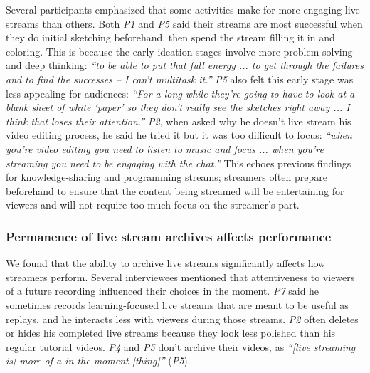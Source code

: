 Several participants emphasized that some activities make for more engaging live streams than others. Both \textit{P1} and \textit{P5} said their streams are most successful when they do initial sketching beforehand, then spend the stream filling it in and coloring. This is because the early ideation stages involve more problem-solving and deep thinking: \textit{``to be able to put that full energy ... to get through the failures and to find the successes -- I can't multitask it.''} \textit{P5} also felt this early stage was less appealing for audiences: \textit{``For a long while they're going to have to look at a blank sheet of white `paper' so they don't really see the sketches right away ... I think that loses their attention.''} \textit{P2}, when asked why he doesn't live stream his video editing process, he said he tried it but it was too difficult to focus: \textit{``when you're video editing you need to listen to music and focus ... when you're streaming you need to be engaging with the chat.''} This echoes previous findings for knowledge-sharing \cite{Lu2018a} and programming \cite{Faas2018} streams; streamers often prepare beforehand to ensure that the content being streamed will be entertaining for viewers and will not require too much focus on the streamer's part. 


\subsubsection{Permanence of live stream archives affects performance}
We found that the ability to archive live streams significantly affects how streamers perform. Several interviewees mentioned that attentiveness to viewers of a future recording influenced their choices in the moment. \textit{P7} said he sometimes records learning-focused live streams that are meant to be useful as replays, and he interacts less with viewers during those streams. \textit{P2} often deletes or hides his completed live streams because they look less polished than his regular tutorial videos. 
\textit{P4} and \textit{P5} don't archive their videos, as \textit{``[live streaming is] more of a in-the-moment [thing]''} (\textit{P5}).





